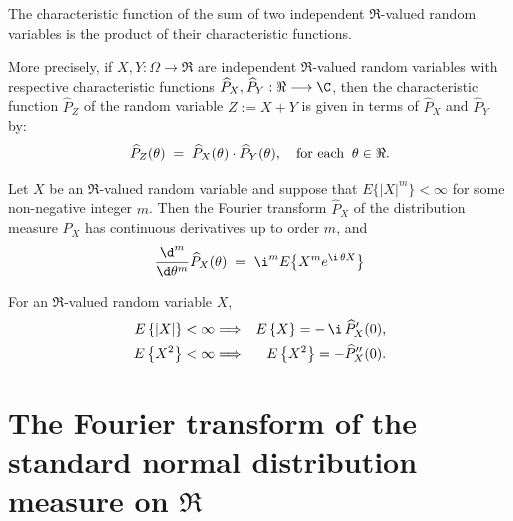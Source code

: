 \documentclass{article}
\begin{document}
\begin{theorem}\label{FourierHomomorphism} \mbox{} \vskip 0.1cm \noindent
The characteristic function of the sum of two independent $\Re$-valued random variables is the product of their characteristic functions.  

More precisely, if $X, Y : \Omega \longrightarrow \Re$ are independent $\Re$-valued random variables with respective characteristic functions $\widehat{P}_{X}, \widehat{P}_{Y} : \Re \longrightarrow \C$, then the characteristic function $\widehat{P}_{Z}$ of the random variable $Z := X + Y$ is given in terms of $\widehat{P}_{X}$ and $\widehat{P}_{Y}$ by:
\begin{equation*}
\widehat{P}_{Z}(\theta) \; = \; \widehat{P}_{X}(\theta)\cdot\widehat{P}_{Y}(\theta),
\quad\textnormal{for each}\;\; \theta\in\Re.
\end{equation*}
\end{theorem}

\begin{theorem}\label{FourierPartials} \mbox{} \vskip 0.1cm \noindent
Let $X$ be an $\Re$-valued random variable and suppose that $E\{|X|^{m}\} < \infty$ for some non-negative integer $m$.  Then the Fourier transform $\widehat{P}_{X}$ of the distribution measure $P_{X}$ has continuous derivatives up to order $m$, and
\begin{equation*}
\dfrac{\d^{m}}{\d \theta^{m}}\widehat{P}_{X}(\theta) \; = \; \i^{m}E\!\left\{X^{m}e^{\i\,\theta X}\right\}
\end{equation*}
\end{theorem}

\begin{corollary}\label{FourierMoments} \mbox{} \vskip 0.1cm \noindent
For an $\Re$-valued random variable $X$,
\begin{eqnarray*}
E\left\{|X|\right\}     < \infty & \Longrightarrow & E\left\{X\right\}       = -\,\i \, \widehat{P}'_{X}(0), \\
E\left\{X^{2}\right\} < \infty & \Longrightarrow & E\left\{X^{2}\right\} = - \widehat{P}_{X}''(0). \\
\end{eqnarray*}
\end{corollary}


\section{The Fourier transform of the standard normal distribution measure on $\Re$}
\setcounter{theorem}{0}
\end{document}
